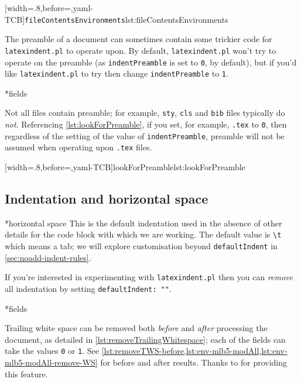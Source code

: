  [width=.8\linewidth,before=\centering,yaml-TCB]{\texttt{fileContentsEnvironments}}{lst:fileContentsEnvironments}


 The preamble of a document can sometimes contain some trickier code for
 \texttt{latexindent.pl} to operate upon. By default, \texttt{latexindent.pl} won't try
 to operate on the preamble (as \texttt{indentPreamble} is set to \texttt{0}, by
 default), but if you'd like \texttt{latexindent.pl} to try then change
 \texttt{indentPreamble} to \texttt{1}.

*{fields}

 Not all files contain preamble; for example, \texttt{sty}, \texttt{cls} and \texttt{bib}
 files typically do \emph{not}. Referencing \cref{lst:lookForPreamble}, if you set, for
 example, \texttt{.tex} to \texttt{0}, then regardless of the setting of the value of
 \texttt{indentPreamble}, preamble will not be assumed when operating upon \texttt{.tex}
 files.

 [width=.8\linewidth,before=\centering,yaml-TCB]{lookForPreamble}{lst:lookForPreamble}


\subsection{Indentation and horizontal space}\label{subsec:indentation:and:horizontal:space}
*{horizontal space}
 This is the default indentation used in the absence of other details for the code block
 with which we are working. The default value is \lstinline!\t! which means a tab; we
 will explore customisation beyond \texttt{defaultIndent} in
 \vref{sec:noadd-indent-rules}.

 If you're interested in experimenting with \texttt{latexindent.pl} then you can
 \emph{remove} all indentation by setting \texttt{defaultIndent: ""}.

*{fields}\label{yaml:removeTrailingWhitespace}

 Trailing white space can be removed both \emph{before} and \emph{after} processing the
 document, as detailed in \cref{lst:removeTrailingWhitespace}; each of the fields can
 take the values \texttt{0} or \texttt{1}. See
 \vref{lst:removeTWS-before,lst:env-mlb5-modAll,lst:env-mlb5-modAll-remove-WS} for before
 and after results. Thanks to \cite{vosskuhle} for providing this feature.

